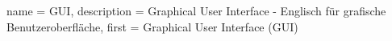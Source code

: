
{
    name = GUI,
    description = Graphical User Interface - Englisch für grafische Benutzeroberfläche,
    first = Graphical User Interface (GUI)
}
